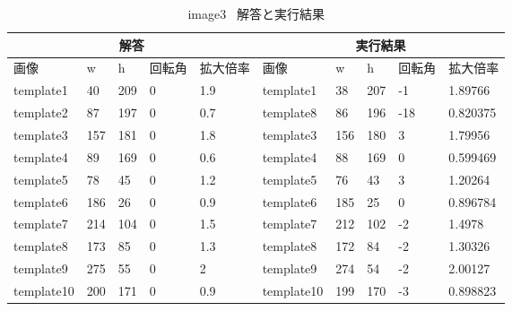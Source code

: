 \begin{table}[]
\centering
\caption{image3~ 解答と実行結果}
\label{my-label3}
\begin{tabular}{|l|l|l|l|l||l|l|l|l|l|}
\hline
\multicolumn{5}{|c||}{解答}            & \multicolumn{5}{c|}{実行結果}               \\ \hline
画像         & w   & h   & 回転角 & 拡大倍率 & 画像         & w   & h   & 回転角 & 拡大倍率     \\ \hline
template1  & 40  & 209 & 0   & 1.9  & template1  & 38  & 207 & -1  & 1.89766  \\ \hline
\rowcolor[HTML]{C0C0C0} 
template2  & 87  & 197 & 0   & 0.7  & template8  & 86  & 196 & -18 & 0.820375 \\ \hline
template3  & 157 & 181 & 0   & 1.8  & template3  & 156 & 180 & 3   & 1.79956  \\ \hline
template4  & 89  & 169 & 0   & 0.6  & template4  & 88  & 169 & 0   & 0.599469 \\ \hline
template5  & 78  & 45  & 0   & 1.2  & template5  & 76  & 43  & 3   & 1.20264  \\ \hline
template6  & 186 & 26  & 0   & 0.9  & template6  & 185 & 25  & 0   & 0.896784 \\ \hline
template7  & 214 & 104 & 0   & 1.5  & template7  & 212 & 102 & -2  & 1.4978   \\ \hline
template8  & 173 & 85  & 0   & 1.3  & template8  & 172 & 84  & -2  & 1.30326  \\ \hline
template9  & 275 & 55  & 0   & 2    & template9  & 274 & 54  & -2  & 2.00127  \\ \hline
template10 & 200 & 171 & 0   & 0.9  & template10 & 199 & 170 & -3  & 0.898823 \\ \hline
\end{tabular}
\end{table}

